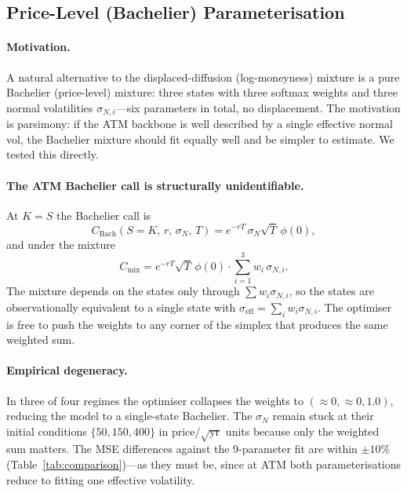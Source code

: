 \documentclass[12pt]{article}
\begin{document}
\subsection{Price-Level (Bachelier) Parameterisation}
\label{sec:robust_pricelevel}

\paragraph{Motivation.} A natural alternative to the displaced-diffusion (log-moneyness) mixture is a pure Bachelier (price-level) mixture: three states with three softmax weights and three normal volatilities $\sigma_{N,i}$---six parameters in total, no displacement. The motivation is parsimony: if the ATM backbone is well described by a single effective normal vol, the Bachelier mixture should fit equally well and be simpler to estimate. We tested this directly.

\paragraph{The ATM Bachelier call is structurally unidentifiable.} At $K=S$ the Bachelier call is
\begin{equation}
  C_{\text{Bach}}(S{=}K,\,r,\,\sigma_{N},\,T) = e^{-rT}\,\sigma_{N}\sqrt{T}\,\phi(0),
\end{equation}
and under the mixture
\begin{equation}
  C_{\text{mix}} = e^{-rT}\sqrt{T}\,\phi(0)\cdot \sum_{i=1}^{3} w_i\,\sigma_{N,i}.
\end{equation}
The mixture depends on the states only through $\sum w_i\sigma_{N,i}$, so the states are observationally equivalent to a single state with $\sigma_{\text{eff}} = \sum_i w_i \sigma_{N,i}$. The optimiser is free to push the weights to any corner of the simplex that produces the same weighted sum.

\paragraph{Empirical degeneracy.} In three of four regimes the optimiser collapses the weights to $(\approx 0, \approx 0, 1.0)$, reducing the model to a single-state Bachelier. The $\sigma_N$ remain stuck at their initial conditions $\{50,150,400\}$ in price/$\sqrt{\text{yr}}$ units because only the weighted sum matters. The MSE differences against the 9-parameter fit are within $\pm 10\%$ (Table~\ref{tab:comparison})---as they must be, since at ATM both parameterisations reduce to fitting one effective volatility.
\end{document}
